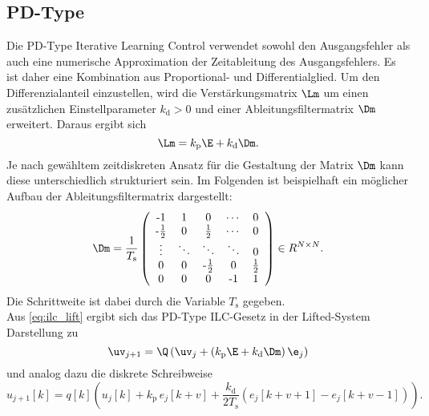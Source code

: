 \subsection{PD-Type}
Die PD-Type Iterative Learning Control verwendet sowohl den Ausgangsfehler als auch eine numerische Approximation der Zeitableitung des Ausgangsfehlers. Es ist daher eine Kombination aus Proportional- und Differentialglied. Um den Differenzialanteil einzustellen, wird die Verstärkungsmatrix $\Lm$ um einen zusätzlichen Einstellparameter $k_\mathrm{d} > 0$ und einer Ableitungsfiltermatrix $\Dm$ erweitert. Daraus ergibt sich
\begin{equation}
	\label{eq:L_pd}
	\Lm = k_\mathrm{p} \E + k_\mathrm{d} \Dm.
\end{equation}
Je nach gewähltem zeitdiskreten Ansatz für die Gestaltung der Matrix $\Dm$ kann diese unterschiedlich strukturiert sein. Im Folgenden ist beispielhaft ein möglicher Aufbau der Ableitungsfiltermatrix dargestellt:
\begin{equation}
	\label{eq:D}
	\Dm = \frac{1}{T_\mathrm{s}}\left( \begin{array}{ccccc}
		$-$1 & 1 & 0 & \cdots & 0 \\
		$-$\frac{1}{2} & 0 & \frac{1}{2} & \cdots & 0 \\
		\vdots & \ddots & \ddots & \ddots & 0 \\
		0 & 0 & $-$\frac{1}{2} & 0 & \frac{1}{2} \\
		0 & 0 & 0 & $-$1 & 1\\
	\end{array}\right) \in R^{N \times N}.
\end{equation}
Die Schrittweite ist dabei durch die Variable $T_\mathrm{s}$ gegeben.\\
Aus \autoref{eq:ilc_lift} ergibt sich das PD-Type ILC-Gesetz in der Lifted-System Darstellung zu
\begin{equation}
	\label{eq:ilc_pd}
	\uv_{j+1} = \Q \left( \uv_j + \left(k_\mathrm{p}  \E  +  k_\mathrm{d} \Dm \right) \e_j \right)
\end{equation}
und analog dazu die diskrete Schreibweise
\begin{equation}
	\label{eq:ilc_pd_k}
	u_{j+1}[k] = q[k] \left(u_j[k] + k_\mathrm{p} \, e_j[k+v] + \frac{k_\mathrm{d}}{2T_\mathrm{s}}\left(e_j[k+v+1] - e_j[k+v-1]  \right) \right).
\end{equation}

